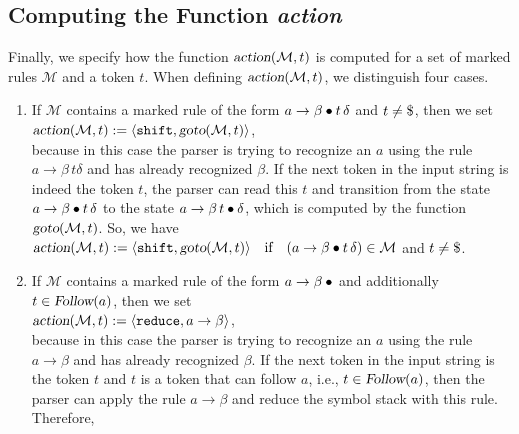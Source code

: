 \subsection{Computing the Function \textsl{action}}
Finally, we specify how the function \(\textsl{action}(\mathcal{M},t)\) is computed for a set of marked rules \(\mathcal{M}\) and a token \(t\). When defining \(\textsl{action}(\mathcal{M},t)\), we distinguish four cases.
\begin{enumerate}
\item If \(\mathcal{M}\) contains a marked rule of the form \(a \rightarrow \beta \mdot t\, \delta\) and \(t \neq \symbol{36}\), then we set
      \\[0.2cm]
      \hspace*{1.3cm}
      \(\textsl{action}(\mathcal{M},t) := \langle \texttt{shift}, \textsl{goto}(\mathcal{M},t) \rangle\),
      \\[0.2cm]
      because in this case the parser is trying to recognize an \(a\) using the rule \(a \rightarrow \beta\, t \delta\)
      and has already recognized \(\beta\). If the next token in the input string is indeed the token  
      \(t\), the parser can read this \(t\) and transition from the state \(a \rightarrow \beta \mdot t\,
      \delta\) to the state  
      \(a \rightarrow \beta\, t \mdot \delta\), which is computed by the function \(\textsl{goto}(\mathcal{M},t)\). So, we have
      \\[0.2cm]
      \hspace*{1.3cm}
      \(\textsl{action}(\mathcal{M},t) := \langle \texttt{shift}, \textsl{goto}(\mathcal{M},t) \rangle
         \quad \text{if} \quad (a \rightarrow \beta \mdot t\, \delta) \in \mathcal{M}
      \) and \(t \neq \symbol{36}\).
\item If \(\mathcal{M}\) contains a marked rule of the form \(a \rightarrow \beta \mdot\) and additionally \(t \in \textsl{Follow}(a)\), then we set
      \\[0.2cm]
      \hspace*{1.3cm}
      \(\textsl{action}(\mathcal{M},t) := \langle \texttt{reduce}, a \rightarrow \beta \rangle\),
      \\[0.2cm]
      because in this case the parser is trying to recognize an \(a\) using the rule \(a \rightarrow \beta\)
      and has already recognized \(\beta\). If the next token in the input string is the token \(t\) and \(t\)
      is a token that can follow \(a\), i.e., \(t \in \textsl{Follow}(a)\), then the parser can apply the rule
      \(a \rightarrow \beta\) and reduce the symbol stack with this rule. Therefore, 

\end{enumerate}
